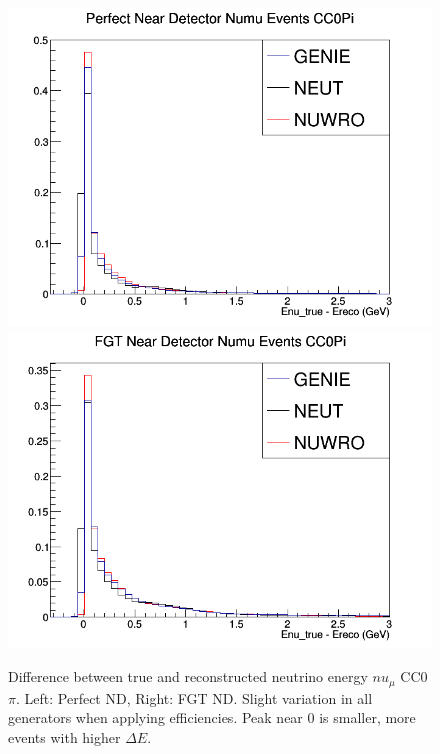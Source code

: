 \documentclass[12pt]{article}
\begin{document}
\begin{figure}[h]
\centering
{}
\includegraphics[width=\linewidth]{Ereco_Etrue/numu_perfect_ND_CC0Pi.png}
\endminipage
{}
\includegraphics[width=\linewidth]{Ereco_Etrue/numu_FGT_CC0Pi.png}
\endminipage
\caption{Difference between true and reconstructed neutrino energy $nu_\mu$ CC0$\pi$. Left: Perfect ND, Right: FGT ND. Slight variation in all generators when applying efficiencies. Peak near 0 is smaller, more events with higher $\Delta E$.}
\label{fig:numu_Etrue_ereco_perfect_FGT_CC0Pi}
\end{figure}
\end{document}

